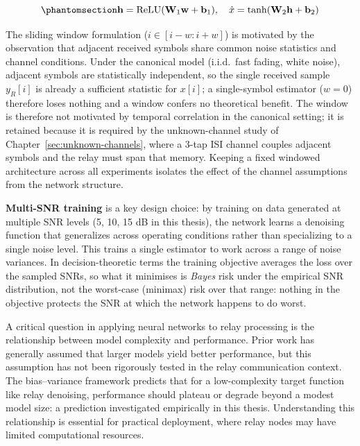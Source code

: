 \begin{equation}\protect\phantomsection\label{eq:mlp-relay}{\mathbf{h} = \text{ReLU}(\mathbf{W}_1 \mathbf{w} + \mathbf{b}_1), \quad \hat{x} = \tanh(\mathbf{W}_2 \mathbf{h} + \mathbf{b}_2)
}\end{equation}

The sliding window formulation ($i \in [i-w:i+w]$) is motivated by the observation that adjacent received symbols share common noise statistics and channel conditions. 
Under the canonical model (i.i.d.\ fast fading, white noise), adjacent symbols are statistically independent, so the single received sample $y_R[i]$ is already a sufficient statistic for $x[i]$; a single-symbol estimator ($w=0$) therefore loses nothing and a window confers no theoretical benefit. The window is therefore not motivated by temporal correlation in the canonical setting; it is retained because it is required by the unknown-channel study of Chapter~\ref{sec:unknown-channels}, where a 3-tap ISI channel couples adjacent symbols and the relay must span that memory. Keeping a fixed windowed architecture across all experiments isolates the effect of the channel assumptions from the network structure. 

\textbf{Multi-SNR training} is a key design choice: by training on data generated at multiple SNR levels (5, 10, 15 dB in this thesis), the network learns a denoising function that generalizes across operating conditions rather than specializing to a single noise level. This trains a single estimator to work across a range of noise variances. In decision-theoretic terms the training objective averages the loss over the sampled SNRs, so what it minimises is \emph{Bayes} risk under the empirical SNR distribution, not the worst-case (minimax) risk over that range: nothing in the objective protects the SNR at which the network happens to do worst.

A critical question in applying neural networks to relay processing is the relationship between model complexity and performance. Prior work has generally assumed that larger models yield better performance, but this assumption has not been rigorously tested in the relay communication context. The bias--variance framework predicts that for a low-complexity target function like relay denoising, performance should plateau or degrade beyond a modest model size: a prediction investigated empirically in this thesis. Understanding this relationship is essential for practical deployment, where relay nodes may have limited computational resources.

